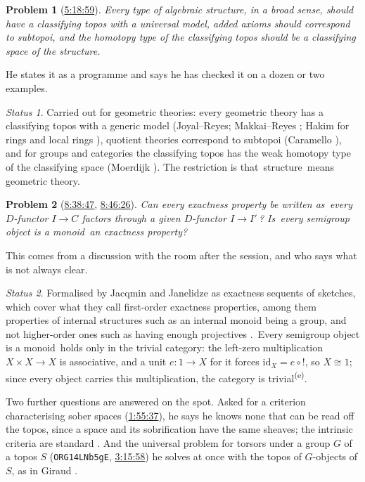 \documentclass[11pt,a4paper]{amsart}
\newtheorem{problem}{Problem}
\theoremstyle{definition}
\theoremstyle{remark}
\newtheorem*{status}{Status}
\newcommand{\q}[1]{\guillemotleft\,#1\,\guillemotright}
\newcommand{\ts}[3]{\href{https://www.youtube.com/watch?v=#1&t=#2}{#3}}
\newcommand{\own}{\textsuperscript{(e)}}
\begin{document}
\begin{problem}[\ts{PqCQM3Pcl6Q}{5h18m59s}{5:18:59}]\label{p:classifying}
Every type of algebraic structure, in a broad sense, should have a classifying topos with a universal model, added axioms should correspond to subtopoi, and the homotopy type of the classifying topos should be a classifying space of the structure.
\end{problem}
He states it as a programme and says he has checked it on a dozen or two examples.

\begin{status}
Carried out for geometric theories: every geometric theory has a classifying topos with a generic model (Joyal--Reyes; Makkai--Reyes \cite{mr}; Hakim for rings and local rings \cite{hakim}), quotient theories correspond to subtopoi (Caramello \cite{caramello}), and for groups and categories the classifying topos has the weak homotopy type of the classifying space (Moerdijk \cite{moerdijk}). The restriction is that \q{structure} means geometric theory.
\end{status}

\begin{problem}[\ts{PqCQM3Pcl6Q}{8h38m47s}{8:38:47}, \ts{PqCQM3Pcl6Q}{8h46m26s}{8:46:26}]\label{p:exactness}
Can every exactness property be written as \q{every $D$-functor $I\to C$ factors through a given $D$-functor $I\to I'$}? Is \q{every semigroup object is a monoid} an exactness property?
\end{problem}
This comes from a discussion with the room after the session, and who says what is not always clear.

\begin{status}
Formalised by Jacqmin and Janelidze as exactness sequents of sketches, which cover what they call first-order exactness properties, among them properties of internal structures such as an internal monoid being a group, and not higher-order ones such as having enough projectives \cite{jacqmin}. \q{Every semigroup object is a monoid} holds only in the trivial category: the left-zero multiplication $X\times X\to X$ is associative, and a unit $e\colon 1\to X$ for it forces $\mathrm{id}_X=e\circ{!}$, so $X\cong 1$; since every object carries this multiplication, the category is trivial\own.
\end{status}

Two further questions are answered on the spot. Asked for a criterion characterising sober spaces (\ts{PqCQM3Pcl6Q}{1h55m37s}{1:55:37}), he says he knows none that can be read off the topos, since a space and its sobrification have the same sheaves; the intrinsic criteria are standard \cite{stone}. And the universal problem for torsors under a group $G$ of a topos $S$ (\texttt{ORG14LNb5gE}, \ts{ORG14LNb5gE}{3h15m58s}{3:15:58}) he solves at once with the topos of $G$-objects of $S$, as in Giraud \cite{giraud}.
\end{document}
